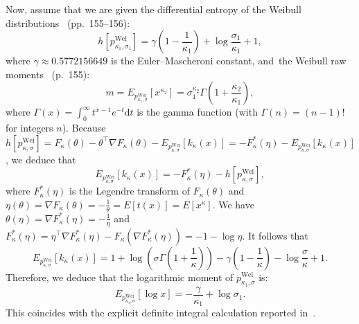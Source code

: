 \documentclass[entropy,article,accept,oneauthor,pdftex,entropy]{Definitions/mdpi}
\def\Wei{\mathrm{Wei}}
\begin{document}
\begin{paracol}{2}
\begin{Example}
Now, assume that we are given the differential entropy of the Weibull distributions~\cite{diffentropy-2013} (pp.~155--156):
$$
h\left[p^\Wei_{\kappa_1,\sigma_1}\right]=\gamma\left(1-\frac{1}{\kappa_1}\right)+\log\frac{\sigma_1}{\kappa_1}+1,
$$
where $\gamma\approx 0.5772156649$ is the Euler--Mascheroni constant, and~the Weibull raw moments~\cite{diffentropy-2013} (p.~155):
$$
m=E_{p^\Wei_{\kappa_1,\sigma}}\left[x^{\kappa_2}\right] = \sigma_1^{\kappa_2} \Gamma\left(1+\frac{\kappa_2}{\kappa_1}\right),
$$
where $\Gamma(x)=\int_0^\infty t^{x-1} e^{-t} \mathrm{d}t$ is the gamma function (with $\Gamma(n)=(n-1)!$ for integers $n$).
Because $h[p^\Wei_{\kappa,\sigma}]=F_\kappa(\theta)-\theta^\top\nabla F_\kappa(\theta)-E_{p^\Wei_{\kappa,\sigma}}[k_\kappa(x)]
=-F^*_\kappa(\eta)-E_{p^\Wei_{\kappa,\sigma}}[k_\kappa(x)]$, we deduce that
$$
E_{p^\Wei_{\kappa,\sigma}}[k_\kappa(x)]=-F_\kappa^*(\eta)-h\left[p^\Wei_{\kappa,\sigma}\right],
$$
where $F^*_\kappa(\eta)$ is the Legendre transform of $F_\kappa(\theta)$ and $\eta(\theta)=\nabla F_\kappa(\theta)=-\frac{1}{\theta}=E[t(x)]=E[x^\kappa]$.
We have $\theta(\eta)=\nabla F^*_\kappa(\eta)=-\frac{1}{\eta}$ and $F^*_\kappa(\eta)=\eta^\top\nabla F^*_\kappa(\eta)-F_\kappa(\nabla F^*_\kappa(\eta))=-1-\log\eta$.
It follows that 
$$
E_{p^\Wei_{\kappa,\sigma}}[k_\kappa(x)]=1+\log\left(\sigma\Gamma\left(1+\frac{1}{\kappa}\right)\right)-\gamma\left(1-\frac{1}{\kappa}\right)-\log\frac{\sigma}{\kappa}+1.
$$
Therefore, we deduce that the logarithmic moment of $p^\Wei_{\kappa_1,\sigma}$ is:
$$
E_{p^\Wei_{\kappa_1,\sigma}}[\log x]=-\frac{\gamma}{\kappa_1}+\log\sigma_1.
$$
This coincides with the explicit definite integral calculation reported in~\cite{KLDWeibull-2013}.


\end{Example}
\end{paracol}
\end{document}
